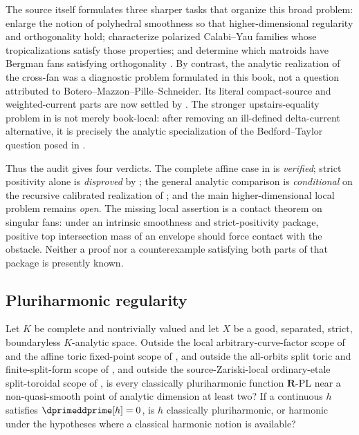 The source itself formulates three sharper tasks that organize this broad
problem: enlarge the notion of polyhedral smoothness so that higher-dimensional
regularity and orthogonality hold; characterize polarized Calabi--Yau
families whose tropicalizations satisfy those properties; and determine
which matroids have Bergman fans satisfying orthogonality
\cite[pp.~3--4, \S1.5, and Remark~6.27]{BMPS26}.  By contrast, the analytic
realization of the cross-fan was a diagnostic problem formulated in this
book, not a question attributed to Botero--Mazzon--Pille--Schneider.  Its
literal compact-source and weighted-current parts are now settled by
.
The stronger upstairs-equality problem in
 is not merely book-local: after
removing an ill-defined delta-current alternative, it is precisely the
analytic specialization of the Bedford--Taylor question posed in
\cite[\S8.6.1 and Definition~8.6.2]{CLD25}.

Thus the audit gives four verdicts.  The complete affine case in
 is \emph{verified};
strict positivity alone is \emph{disproved} by
; the general analytic
comparison is \emph{conditional} on the recursive calibrated realization
of ; and the main
higher-dimensional local problem remains \emph{open}.  The missing local
assertion is a contact theorem on singular fans: under an intrinsic
smoothness and strict-positivity package, positive top intersection mass of
an envelope should force contact with the obstacle.  Neither a proof nor a
counterexample satisfying both parts of that package is presently known.

\subsection{Pluriharmonic regularity}

\begin{problem}\label{prob:frontier-pluriharmonic}
Let \(K\) be complete and nontrivially valued and let \(X\) be a good,
separated, strict, boundaryless \(K\)-analytic space.  Outside the local
arbitrary-curve-factor scope of
 and the affine toric
fixed-point scope of , and
outside the all-orbits split toric and finite-split-form scope of
, and outside the
source-Zariski-local ordinary-etale split-toroidal scope of
, is every
classically pluriharmonic function \(\mathbf R\)-PL near a non-quasi-smooth point of
analytic dimension at least two?  If a continuous \(h\) satisfies
\(\dprimeddprime[h]=0\), is \(h\) classically pluriharmonic, or harmonic under
the hypotheses where a classical harmonic notion is available?
\end{problem}

